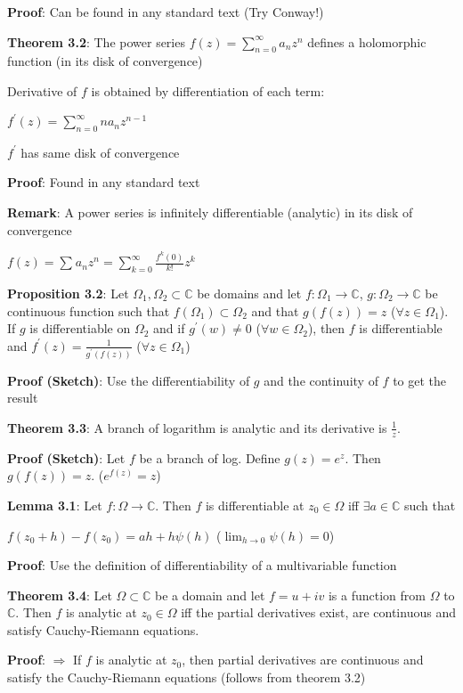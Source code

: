 \documentclass{article}
\begin{document}
\begin{flushleft}
\textbf{Proof}: Can be found in any standard text (Try Conway!)

\textbf{Theorem 3.2}: The power series $f(z)=\sum_{n=0}^{\infty} a_nz^n$ defines a holomorphic function (in its disk of convergence)

Derivative of $f$ is obtained by differentiation of each term:

$f^{'}(z)=\sum_{n=0}^{\infty} na_nz^{n-1}$ 

$f^{'}$ has same disk of convergence

\textbf{Proof}: Found in any standard text

\textbf{Remark}: A power series is infinitely differentiable (analytic) in its disk of convergence

$f(z)=\sum_{}^{}a_nz^n =\sum_{k=0}^{\infty} \frac{f^{k}(0)}{k!} z^k$

\textbf{Proposition 3.2}: Let $\Omega_1,\Omega_2 \subset \mathds{C}$ be domains and let $f:\Omega_1\rightarrow \mathds{C}$,
$g:\Omega_2\rightarrow \mathds{C}$ be continuous function such that $f(\Omega_1)\subset \Omega_2$ and that $g(f(z))=z$ ($\forall z\in \Omega_1$).
If $g$ is differentiable on $\Omega_2$ and if $g^{'}(w)\neq 0$ ($\forall w \in \Omega_2$), then $f$ is differentiable and $f^{'}(z)=\frac{1}{g^{'}(f(z))}$ ($\forall z\in \Omega_1$)

\textbf{Proof (Sketch)}: Use the differentiability of $g$ and the continuity of $f$ to get the result 

\textbf{Theorem 3.3}: A branch of logarithm is analytic and its derivative is $\frac{1}{z}$.

\textbf{Proof (Sketch)}: Let $f$ be a branch of log. Define $g(z)=e^z$. Then $g(f(z))=z$. ($e^{f(z)}=z$)

\textbf{Lemma 3.1}: Let $f:\Omega \rightarrow \mathds{C}$. Then $f$ is differentiable at $z_0\in \Omega$ iff $\exists a\in \mathds{C}$ such that 

$f(z_0+h)-f(z_0)= ah+h\psi(h)$ ($\lim_{h \to 0} \psi(h)=0$)

\textbf{Proof}: Use the definition of differentiability of a multivariable function

\textbf{Theorem 3.4}: Let $\Omega \subset \mathds{C}$ be a domain and let $f=u+iv$ is a function from $\Omega$ to $\mathds{C}$.
Then $f$ is analytic at $z_0\in \Omega$ iff the partial derivatives exist, are continuous and satisfy Cauchy-Riemann equations.

\textbf{Proof}: $\Rightarrow$ If $f$ is analytic at $z_0$, then partial derivatives are continuous and satisfy the Cauchy-Riemann equations (follows from theorem 3.2)


\end{flushleft}
\end{document}
